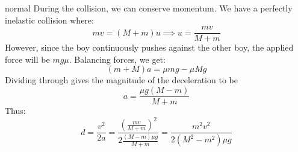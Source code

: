 \begin{solution}{normal}
During the collision, we can conserve momentum. We have a perfectly inelastic collision where:
$$mv=(M+m)u \implies u=\frac{mv}{M+m}$$
However, since the boy continuously pushes against the other boy, the applied force will be $mg\mu$. Balancing forces, we get:
$$(m+M)a = \mu mg - \mu Mg$$
Dividing through gives the magnitude of the deceleration to be
$$a = \frac{\mu g(M - m)}{M+m}$$
Thus:
$$d=\frac{v^2}{2a}=\frac{\left(\frac{mv}{M+m}\right)^2}{2\frac{(M-m)\mu g}{M+m}}=\boxed{\frac{m^2v^2}{2(M^2-m^2)\mu g}}$$
\end{solution}
